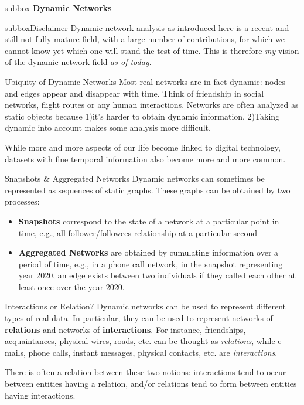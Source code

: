 \begin{subbox}{subbox}{}
    \centering
    \Large{\textbf{Dynamic Networks}}
\end{subbox}


\begin{subbox}{subbox}{Disclaimer}
    Dynamic network analysis as introduced here is a recent and still not fully mature field, with a large number of contributions, for which we cannot know yet which one will stand the test of time. This is therefore \textit{my} vision of the dynamic network field  \textit{as of today}.
\end{subbox}


\begin{textbox}{Ubiquity of Dynamic Networks}
    Most real networks are in fact dynamic: nodes and edges appear and disappear with time. Think of friendship in social networks, flight routes or any human interactions. Networks are often analyzed as static objects because 1)it's harder to obtain dynamic information, 2)Taking dynamic into account makes some analysis more difficult.

    While more and more aspects of our life become linked to digital technology, datasets with fine temporal information also become more and more common.
\end{textbox}


\begin{textbox}{Snapshots \& Aggregated Networks}
    Dynamic networks can sometimes be represented as sequences of static graphs.
    These graphs can be obtained by two processes:
    \begin{itemize}
        \item \textbf{Snapshots} correspond to the state of a network at a particular point in time, e.g., all follower/followees relationship at a particular second
        \item \textbf{Aggregated Networks} are obtained by cumulating information over a period of time, e.g., in a phone call network, in the snapshot representing year 2020, an edge exists between two individuals if they called each other at least once over the year 2020.
    \end{itemize}
\end{textbox}


\begin{textbox}{Interactions or Relation?}
    Dynamic networks can be used to represent different types of real data. In particular, they can be used to represent networks of \textbf{relations} and networks of \textbf{interactions}. For instance, friendships, acquaintances, physical wires, roads, etc. can be thought as \textit{relations}, while e-mails, phone calls, instant messages, physical contacts, etc. are \textit{interactions}.

    There is often a relation between these two notions: interactions tend to occur between entities having a relation, and/or relations tend to form between entities having interactions.
\end{textbox}


